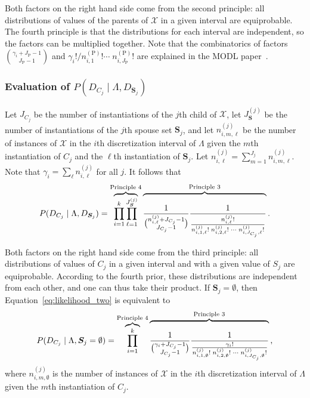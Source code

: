 \documentclass[twoside,11pt]{article}
\newcommand{\citep}[1]{\cite{#1}}
\newcommand{\cX}{\mathcal{X}} %
\begin{document}
Both factors on the right hand side come from the second principle: all distributions of values of the parents of $\cX$ in a given interval are equiprobable.
The fourth principle is that the distributions for each interval are independent, so the factors can be multiplied together. Note that the combinatorics of factors ${{\gamma_i + J_\text{P} - 1}\choose{J_\text{P} - 1}}$ and ${
	{\gamma_i}!}/{{n^{(\text{P})}_{i,1}}! \cdots \; {n^{(\text{P})}_{i,J_\text{P}}}!}$ are explained in the MODL paper~\citep{Boulle_2006}.

\subsubsection{Evaluation of $P(D_{C_j} \mid \Lambda, D_{\bm{S}_j})$}
Let $J_{C_j}$ be the number of instantiations of the $j$th child of $\cX$, let $J_{\bm{S}}^{(j)}$ be the number of instantiations of the $j$th spouse set $\bm{S}_j$, and let $n^{(j)}_{i,m,\ell}$ be the number of instances of $\cX$ in the $i$th discretization interval of $\Lambda$ given the $m$th instantiation of $C_j$ and the $\ell$th instantiation of $\bm{S}_j$.
Let ${n^{(j)}_{i,\ell} = \sum_{m=1}^{J_j} n^{(j)}_{i,m,\ell}}$.
Note that ${\gamma_i = \sum_{\ell} n^{(j)}_{i,\ell}}$ for all $j$.
It follows that
\begin{equation}
  \label{eq:likelihood_two}
  P(D_{C_j} \mid \Lambda, D_{\bm{S}_j}) =
  \overbrace{\prod_{i=1}^{k} \prod_{\ell=1}^{J_{\bm{S}}^{(j)}}}^{\text{Principle 4}}
    \overbrace{\rule{0pt}{2.3em}
      {
        \frac{1}{
          {{n^{(j)}_{i,\ell} + J_{C_j} - 1}\choose{J_{C_j}-1}}}
        }
        {\frac{
          1
        }{
          \frac{
            {n^{(j)}_{i,\ell}}!
          }{
            {n^{(j)}_{i,1,\ell}!} \; {n^{(j)}_{i,2,\ell}!} \; \cdots \; {n^{(j)}_{i,J_{C_j},\ell}!}
          }
        }
      }
    }^{\text{Principle 3}}
    \text{.}
\end{equation}

Both factors on the right hand side come from the third principle: all distributions of values of $C_j$ in a given interval and with a given value of $S_j$ are equiprobable.
According to the fourth prior, these distributions are independent from each other, and one can thus take their product.
If $\bm{S}_j = \emptyset$, then Equation~\ref{eq:likelihood_two} is equivalent to
\begin{equation}
  \label{eq:likelihood_three}
  P(D_{C_j} \mid \Lambda, \bm{S}_j = \emptyset) =
  \overbrace{\prod_{i=1}^{k}}^{\text{Principle 4}}
  \overbrace{\rule{0pt}{2.3em}{
    {1}\over{
      {\gamma_i + J_{C_j} - 1}\choose{J_{C_j}-1}}
    }
    {{1}\over{
      {{\gamma_i}!} \over {
        {n^{(j)}_{i,1,\emptyset}!} \; {n^{(j)}_{i,2,\emptyset}!} \; \cdots \; {n^{(j)}_{i,J_{C_j},\emptyset} !}
      }
    }
  }}^{\text{Principle 3}}
  \text{,}
\end{equation}
where $n^{(j)}_{i,m,\emptyset}$ is the number of instances of $\cX$ in the $i$th discretization interval of $\Lambda$ given the $m$th instantiation of $C_j$.
\end{document}
